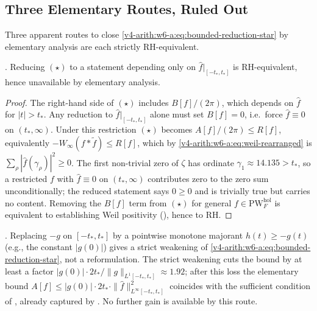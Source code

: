 \subsection{Three Elementary Routes, Ruled Out}
\label{v4-arith:w6-a:bounded-interval:ruled-out}

Three apparent routes to close \eqref{v4-arith:w6-a:eq:bounded-reduction-star}
by elementary analysis are each strictly RH-equivalent.

\begin{proposition}
\label{v4-arith:w6-a:prop:rule-out-projection}
\ClaimStatusProvedHere. Reducing \((\star)\) to a statement depending
only on \(\widehat{f}|_{[-t_{\ast},t_{\ast}]}\) is RH-equivalent, hence
unavailable by elementary analysis.
\end{proposition}

\begin{proof}
The right-hand side of \((\star)\) includes \(B[f]/(2\pi)\), which
depends on \(\widehat{f}\) for \(|t|>t_{\ast}\). Any reduction to
\(\widehat{f}|_{[-t_{\ast},t_{\ast}]}\) alone must set \(B[f]=0\),
i.e.~force \(\widehat{f}\equiv 0\) on \((t_{\ast},\infty)\). Under this
restriction \((\star)\) becomes \(A[f]/(2\pi)\leq R[f]\), equivalently
\(-W_{\infty}(f*\widetilde{f})\leq R[f]\), which by
\eqref{v4-arith:w6-a:eq:weil-rearranged} is
\(\sum_{\rho}|\widehat{f}(\gamma_{\rho})|^{2}\geq 0\). The first
non-trivial zero of \(\zeta\) has ordinate
\(\gamma_{1}\approx 14.135>t_{\ast}\), so a restricted \(f\) with
\(\widehat{f}\equiv 0\) on \((t_{\ast},\infty)\) contributes zero to the
zero sum unconditionally; the reduced statement says \(0\geq 0\) and is
trivially true but carries no content. Removing the \(B[f]\) term from
\((\star)\) for general \(f\in\mathrm{PW}^{\mathrm{hol}}_{F}\) is
equivalent to establishing Weil positivity
(), hence to RH.
\end{proof}

\begin{proposition}
\label{v4-arith:w6-a:prop:rule-out-majorant}
\ClaimStatusProvedHere. Replacing \(-g\) on \([-t_{\ast},t_{\ast}]\) by a
pointwise monotone majorant \(h(t)\geq-g(t)\) (e.g., the constant
\(|g(0)|\)) gives a strict weakening of
\eqref{v4-arith:w6-a:eq:bounded-reduction-star}, not a reformulation.
The strict weakening cuts the bound by at least a factor
\(|g(0)|\cdot 2t_{\ast}/\|g\|_{L^{1}[-t_{\ast},t_{\ast}]}\approx 1.92\);
after this loss the elementary bound
\(A[f]\leq|g(0)|\cdot 2t_{\ast}\cdot\|\widehat{f}\|_{L^{\infty}[-t_{\ast},t_{\ast}]}^{2}\)
coincides with the sufficient condition of
, already captured by
. No further gain is available by
this route.
\end{proposition}

